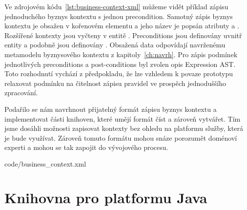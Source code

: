 Ve zdrojovém kódu~\ref{lst:business-context-xml} můžeme vidět
příklad zápisu jednoduchého byznys kontextu s jednou precondition.
Samotný zápis byznys kontextu je obsažen v kořenovém elementu
 a jeho název je popsán atributy
 a . Rozšířené kontexty jsou vyčteny
v entitě . Preconditions jsou
definovány uvnitř entity  a podobně
jsou definovány . Obsažená data odpovídají
navrženému metamodelu byznysového kontextu z kapitoly~\ref{ch:navrh}.
Pro zápis podmínek jednotlivých preconditions a post-conditions byl zvolen
opis Expression AST. Toto rozhodnutí vychází z předpokladu,
že lze vzhledem k povaze prototypu relaxovat podmínku
na čitelnost zápisu pravidel ve prospěch jednoduššího zpracování.

Podařilo se nám navrhnout přijatelný formát zápisu byznys kontextu
a implementovat části knihoven, které umějí formát číst a zároveň vytvářet.
Tím jsme dosáhli možnosti zapisovat kontexty bez ohledu na platformu
služby, která je bude využívat. Zároveň tomuto formátu mohou
snáze porozumět doménoví experti a mohou se tak zapojit do
vývojového procesu.


{code/business_context.xml}

\section{Knihovna pro platformu Java}


